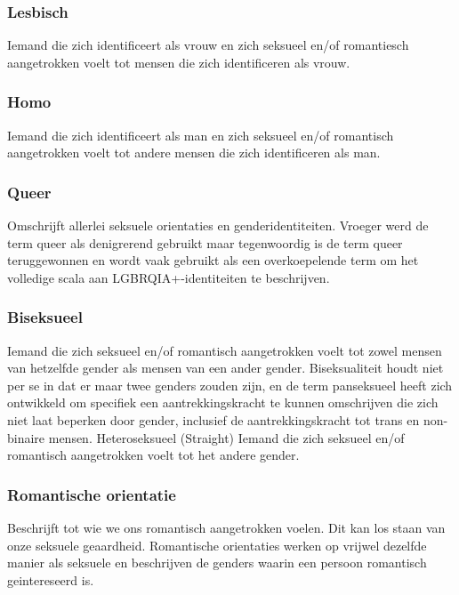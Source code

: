 \documentclass[12pt,openany]{book}
\begin{document}
\subsubsection*{Lesbisch}

Iemand die zich identificeert als vrouw en zich seksueel en/of romantiesch aangetrokken voelt tot mensen die zich identificeren als vrouw.

\subsubsection*{Homo}

Iemand die zich identificeert als man en zich seksueel en/of romantisch aangetrokken voelt tot andere mensen die zich identificeren als man.  

\subsubsection*{Queer}

Omschrijft allerlei seksuele orientaties en genderidentiteiten. Vroeger werd de term queer als denigrerend gebruikt maar tegenwoordig is de term queer teruggewonnen en wordt vaak gebruikt als een overkoepelende term om het volledige scala aan LGBRQIA+-identiteiten te beschrijven.  

\subsubsection*{Biseksueel}

Iemand die zich seksueel en/of romantisch aangetrokken voelt tot zowel mensen van hetzelfde gender als mensen van een ander gender. Biseksualiteit houdt niet per se in dat er maar twee genders zouden zijn, en de term panseksueel heeft zich ontwikkeld om specifiek een aantrekkingskracht te kunnen omschrijven die zich niet laat beperken door gender, inclusief de aantrekkingskracht tot trans en non-binaire mensen.    
Heteroseksueel (Straight)
Iemand die zich seksueel en/of romantisch aangetrokken voelt tot het andere gender.

\subsubsection*{Romantische orientatie}

Beschrijft tot wie we ons romantisch aangetrokken voelen. Dit kan los staan van onze seksuele geaardheid. Romantische orientaties werken op vrijwel dezelfde manier als seksuele en beschrijven de genders waarin een persoon romantisch geintereseerd is.   
\end{document}

